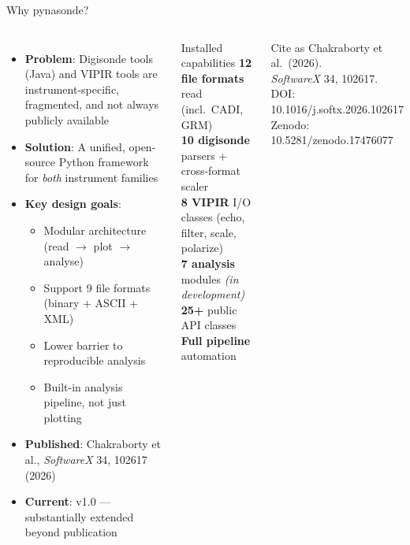 \documentclass[aspectratio=169,11pt]{beamer}
\begin{document}
\begin{frame}{Why pynasonde?}
\begin{columns}
  \begin{itemize}\small
    \item \textbf{Problem}: Digisonde tools (Java) and VIPIR tools are
          instrument-specific, fragmented, and not always publicly available
    \item \textbf{Solution}: A unified, open-source Python framework for
          \emph{both} instrument families
    \item \textbf{Key design goals}:
      \begin{itemize}\scriptsize
        \item Modular architecture (read $\to$ plot $\to$ analyse)
        \item Support 9 file formats (binary + ASCII + XML)
        \item Lower barrier to reproducible analysis
        \item Built-in analysis pipeline, not just plotting
      \end{itemize}
    \item \textbf{Published}: Chakraborty et al., \textit{SoftwareX} 34, 102617 (2026)
    \item \textbf{Current}: v1.0 — substantially extended beyond publication
  \end{itemize}
  \begin{block}{Installed capabilities}
    \scriptsize
    \textbf{12 file formats} read (incl.\ CADI, GRM)\\
    \textbf{10 digisonde} parsers + cross-format scaler\\
    \textbf{8 VIPIR} I/O classes (echo, filter, scale, polarize)\\
    \textbf{7 analysis} modules \textit{(in development)}\\
    \textbf{25+} public API classes\\
    \textbf{Full pipeline} automation
  \end{block}
  \begin{alertblock}{Cite as}
    \tiny
    Chakraborty et al.\ (2026).\\
    \textit{SoftwareX} 34, 102617.\\
    DOI: 10.1016/j.softx.2026.102617\\
    Zenodo: 10.5281/zenodo.17476077
  \end{alertblock}
\end{columns}
\end{frame}
\end{document}
